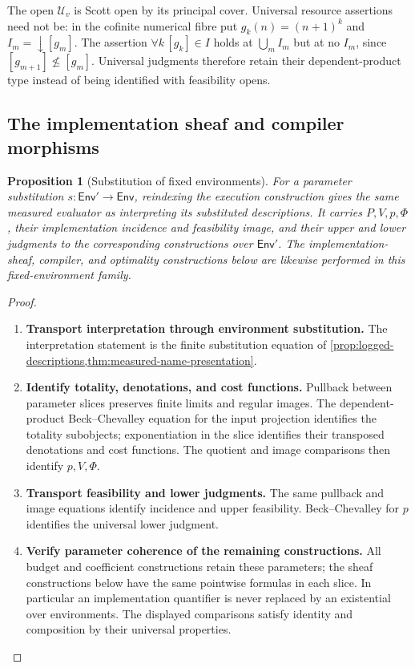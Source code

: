 \documentclass[11pt,a4paper]{article}
\numberwithin{algorithm}{section}
\numberwithin{equation}{section}
\newtheorem{proposition}[proposition]{Proposition}
\theoremstyle{definition}
\theoremstyle{remark}
\theoremstyle{plain}
\newcommand{\Env}{\mathsf{Env}}
\theoremstyle{definition}
\theoremstyle{plain}
\begin{document}
The open $\mathcal U_v$ is Scott open by its principal cover.
Universal resource assertions need not be: in the cofinite
numerical fibre put $g_k(n)=(n+1)^k$ and
$I_m=\downarrow[g_m]$. The assertion $\forall k\,[g_k]\in I$
holds at $\bigcup_m I_m$ but at no $I_m$, since
$[g_{m+1}]\not\le[g_m]$. Universal judgments therefore retain
their dependent-product type instead of being identified with
feasibility opens.
\subsection{The implementation sheaf and compiler morphisms}
\label{sec:implementation-sheaf}
\begin{proposition}[Substitution of fixed environments]
\label{prop:environment-base-change}
For a parameter substitution $s:\Env'\to\Env$, reindexing the
execution construction gives the same measured evaluator as
interpreting its substituted descriptions. It carries $P,V,p,\Phi$,
their implementation incidence and feasibility image, and their upper
and lower judgments to the corresponding constructions over $\Env'$.
The implementation-sheaf, compiler, and optimality constructions below
are likewise performed in this fixed-environment family.
\end{proposition}
\begin{proof}\leavevmode
\begin{enumerate}[leftmargin=*,align=left]
\item \textbf{Transport interpretation through environment substitution.}
The interpretation statement is the finite substitution equation of
\cref{prop:logged-descriptions,thm:measured-name-presentation}.

\item \textbf{Identify totality, denotations, and cost functions.}
Pullback between parameter slices preserves finite limits and regular
images. The dependent-product Beck--Chevalley equation for the input
projection identifies the totality subobjects; exponentiation in the
slice identifies their transposed denotations and cost functions.
The quotient and image comparisons then identify $p,V,\Phi$.

\item \textbf{Transport feasibility and lower judgments.}
The same pullback and image equations identify incidence and upper
feasibility. Beck--Chevalley for $p$ identifies the universal lower
judgment.

\item \textbf{Verify parameter coherence of the remaining constructions.}
All budget and coefficient constructions retain these
parameters; the sheaf constructions below have the same pointwise
formulas in each slice. In particular an implementation quantifier is
never replaced by an existential over environments. The displayed
comparisons satisfy identity and composition by their universal
properties.
\end{enumerate}
\end{proof}
\end{document}
